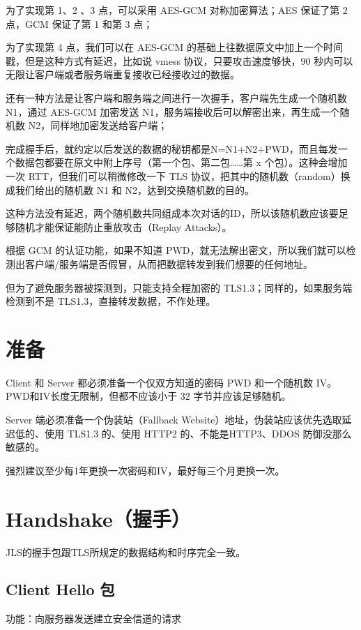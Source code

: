 为了实现第 1、2 、3 点，可以采用 AES-GCM 对称加密算法；AES 保证了第 2 点，GCM 保证了第 1 和第 3 点；

为了实现第 4 点，我们可以在 AES-GCM 的基础上往数据原文中加上一个时间戳，但是这种方式有延迟，比如说 vmess 协议，只要攻击速度够快，90 秒内可以无限让客户端或者服务端重复接收已经接收过的数据。

还有一种方法是让客户端和服务端之间进行一次握手，客户端先生成一个随机数 N1，通过 AES-GCM 加密发送 N1，服务端接收后可以解密出来，再生成一个随机数 N2，同样地加密发送给客户端；

完成握手后，就约定以后发送的数据的秘钥都是N=N1+N2+PWD，而且每发一个数据包都要在原文中附上序号（第一个包、第二包……第 x 个包）。这种会增加一次 RTT，但我们可以稍微修改一下 TLS 协议，把其中的随机数（random）换成我们给出的随机数 N1 和 N2，达到交换随机数的目的。

这种方法没有延迟，两个随机数共同组成本次对话的ID，所以该随机数应该要足够随机才能保证能防止重放攻击（Replay Attacks）。

根据 GCM 的认证功能，如果不知道 PWD，就无法解出密文，所以我们就可以检测出客户端/服务端是否假冒，从而把数据转发到我们想要的任何地址。

但为了避免服务器被探测到，只能支持全程加密的 TLS1.3；同样的，如果服务端检测到不是 TLS1.3，直接转发数据，不作处理。



\section{准备}
Client 和 Server 都必须准备一个仅双方知道的密码 PWD 和一个随机数 IV。PWD和IV长度无限制，但都不应该小于 32 字节并应该足够随机。

Server 端必须准备一个伪装站（Fallback Website）地址，伪装站应该优先选取延迟低的、使用 TLS1.3 的、使用 HTTP2 的、不能是HTTP3、DDOS 防御没那么敏感的。

强烈建议至少每1年更换一次密码和IV，最好每三个月更换一次。

\section{Handshake（握手）}
JLS的握手包跟TLS所规定的数据结构和时序完全一致。

\subsection{Client Hello 包}
功能：向服务器发送建立安全信道的请求

